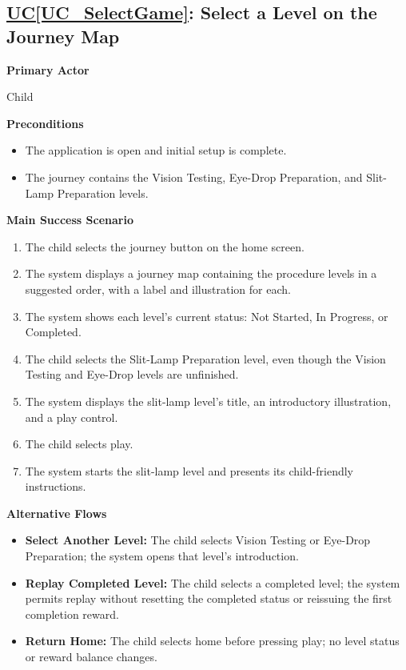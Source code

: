\documentclass[12pt]{article}
\newcounter{ucnum} %
\newcommand{\ucref}[1]{\hyperref[#1]{UC\ref*{#1}}}
\begin{document}
\label{UC_SelectGame}
\subsection{\ucref{UC_SelectGame}: Select a Level on the Journey Map}

\textbf{Primary Actor}

Child

\textbf{Preconditions}
\begin{itemize}
    \item The application is open and initial setup is complete.
    \item The journey contains the Vision Testing, Eye-Drop Preparation,
    and Slit-Lamp Preparation levels.
\end{itemize}

\textbf{Main Success Scenario}
\begin{enumerate}
    \item The child selects the journey button on the home screen.
    \item The system displays a journey map containing the procedure
    levels in a suggested order, with a label and illustration for each.
    \item The system shows each level's current status: Not Started,
    In Progress, or Completed.
    \item The child selects the Slit-Lamp Preparation level, even
    though the Vision Testing and Eye-Drop levels are unfinished.
    \item The system displays the slit-lamp level's title, an
    introductory illustration, and a play control.
    \item The child selects play.
    \item The system starts the slit-lamp level and presents its
    child-friendly instructions.
\end{enumerate}

\textbf{Alternative Flows}
\begin{itemize}
    \item \textbf{Select Another Level:} The child selects Vision Testing
    or Eye-Drop Preparation; the system opens that level's introduction.
    \item \textbf{Replay Completed Level:} The child selects a completed
    level; the system permits replay without resetting the completed
    status or reissuing the first completion reward.
    \item \textbf{Return Home:} The child selects home before pressing
    play; no level status or reward balance changes.
\end{itemize}
\end{document}
